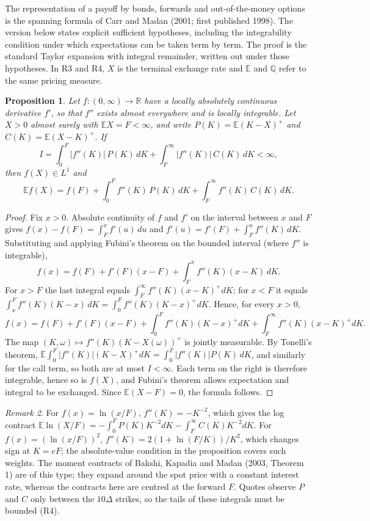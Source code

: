 \documentclass[11pt]{article}
\newtheorem{proposition}{Proposition}
\theoremstyle{remark}
\newtheorem{remark}[proposition]{Remark}
\newcommand{\E}{\mathbb{E}}
\newcommand{\Q}{\mathbb{Q}}
\begin{document}
The representation of a payoff by bonds, forwards and out-of-the-money options is the spanning formula of Carr and Madan (2001; first published 1998). The version below states explicit sufficient hypotheses, including the integrability condition under which expectations can be taken term by term. The proof is the standard Taylor expansion with integral remainder, written out under those hypotheses. In R3 and R4, $X$ is the terminal exchange rate and $\E$ and $\Q$ refer to the same pricing measure.

\begin{proposition}
Let $f:(0,\infty)\to\mathbb{R}$ have a locally absolutely continuous derivative $f'$, so that $f''$ exists almost everywhere and is locally integrable. Let $X>0$ almost surely with $\E X=F<\infty$, and write $P(K)=\E(K-X)^+$ and $C(K)=\E(X-K)^+$. If
\[
I=\int_0^F|f''(K)|\,P(K)\,dK+\int_F^\infty|f''(K)|\,C(K)\,dK<\infty,
\]
then $f(X)\in L^1$ and
\[
\E f(X)=f(F)+\int_0^F f''(K)\,P(K)\,dK+\int_F^\infty f''(K)\,C(K)\,dK.
\]
\end{proposition}

\begin{proof}
Fix $x>0$. Absolute continuity of $f$ and $f'$ on the interval between $x$ and $F$ gives $f(x)-f(F)=\int_F^x f'(u)\,du$ and $f'(u)=f'(F)+\int_F^u f''(K)\,dK$. Substituting and applying Fubini's theorem on the bounded interval (where $f''$ is integrable),
\[
f(x)=f(F)+f'(F)(x-F)+\int_F^x f''(K)(x-K)\,dK.
\]
For $x>F$ the last integral equals $\int_F^\infty f''(K)(x-K)^+dK$; for $x<F$ it equals $\int_x^F f''(K)(K-x)\,dK=\int_0^F f''(K)(K-x)^+dK$. Hence, for every $x>0$,
\[
f(x)=f(F)+f'(F)(x-F)+\int_0^F f''(K)(K-x)^+dK+\int_F^\infty f''(K)(x-K)^+dK.
\]
The map $(K,\omega)\mapsto f''(K)(K-X(\omega))^+$ is jointly measurable. By Tonelli's theorem, $\E\int_0^F|f''(K)|(K-X)^+dK=\int_0^F|f''(K)|P(K)\,dK$, and similarly for the call term, so both are at most $I<\infty$. Each term on the right is therefore integrable, hence so is $f(X)$, and Fubini's theorem allows expectation and integral to be exchanged. Since $\E(X-F)=0$, the formula follows.
\end{proof}

\begin{remark}
For $f(x)=\ln(x/F)$, $f''(K)=-K^{-2}$, which gives the log contract $\E\ln(X/F)=-\int_0^F P(K)K^{-2}dK-\int_F^\infty C(K)K^{-2}dK$. For $f(x)=(\ln(x/F))^2$, $f''(K)=2(1+\ln(F/K))/K^2$, which changes sign at $K=eF$; the absolute-value condition in the proposition covers such weights. The moment contracts of Bakshi, Kapadia and Madan (2003, Theorem 1) are of this type; they expand around the spot price with a constant interest rate, whereas the contracts here are centred at the forward $F$. Quotes observe $P$ and $C$ only between the $10\Delta$ strikes, so the tails of these integrals must be bounded (R4).
\end{remark}
\end{document}
